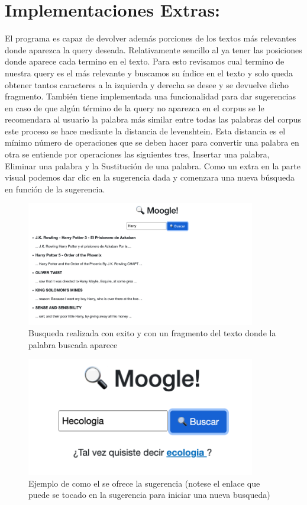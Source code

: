 \documentclass[a4paper,12pt]{article}
\begin{document}
\section{Implementaciones Extras:}\label{sec:Extras}

El programa es capaz de devolver además porciones de los textos más relevantes donde aparezca la query deseada. Relativamente sencillo al ya tener las posiciones donde aparece cada termino en el texto. Para esto revisamos cual termino de nuestra query es el más relevante y buscamos su índice en el texto y solo queda obtener tantos  caracteres a la izquierda y derecha se desee y se devuelve dicho fragmento.
También tiene implementada una funcionalidad para dar sugerencias en caso de que algún término de la query no aparezca en el corpus se le recomendara al usuario la palabra más similar entre todas las palabras del corpus este proceso se hace mediante la distancia de levenshtein. Esta distancia es el mínimo número de operaciones que se deben hacer para convertir una palabra en otra se entiende por operaciones las siguientes tres, Insertar una palabra, Eliminar una palabra y la Sustitución de una palabra.
Como un extra en la parte visual podemos dar clic en la sugerencia dada y comenzara una nueva búsqueda en función de la sugerencia.


\begin{figure}[h]
    \center
    \includegraphics[width=10cm]{Pictures For Moogle!/Picture2.png}
    \caption{Busqueda realizada con exito y con un fragmento del texto donde la palabra buscada aparece}
    \label{fig:logo}
\end{figure}

\begin{figure}[h]
    \center
    \includegraphics[width=10cm]{Pictures For Moogle!/Picture3.png}
    \caption{Ejemplo de como el se ofrece la sugerencia (notese el enlace que puede se tocado en la sugerencia para iniciar una nueva busqueda)}
    \label{fig:logo}
\end{figure}
\end{document}
